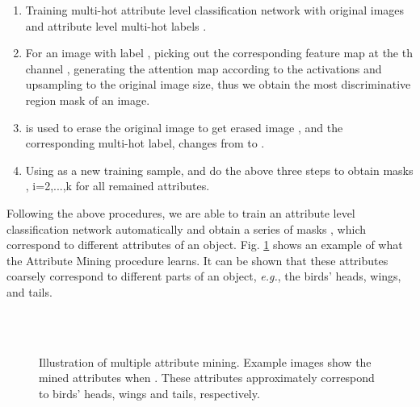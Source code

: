 \documentclass[runningheads]{llncs}
\begin{document}
\begin{enumerate}
  \vspace{-0.1cm}
  \setlength{\itemsep}{1pt}
  \setlength{\parsep}{1pt}
  \setlength{\parskip}{1pt}
 \item Training multi-hot attribute level classification network with original images and attribute level multi-hot labels .
 \item For an image with label , picking out the corresponding feature map at the th channel , generating the attention map according to the activations and upsampling to the original image size, thus we obtain the most discriminative region mask  of an image.
 \item  is used to erase the original image  to get erased image , and the corresponding multi-hot label,  changes from  to .
 \item Using  as a new training sample, and do the above three steps to obtain masks , i=2,...,k for all remained attributes.
\end{enumerate}


Following the above procedures, we are able to train an attribute level classification network automatically and obtain a series of masks , which correspond to different attributes of an object. Fig. \ref{part-heatmap} shows an example of what the Attribute Mining procedure learns. It can be shown that these attributes coarsely correspond to different parts of an object, \emph{e.g.}, the birds' heads, wings, and tails.
\begin{figure}[t]
  \centering
   \hspace{0.17cm}
   \hspace{0.17cm}
   \hspace{0.17cm}
    \\
  
   \hspace{0.17cm}
   \hspace{0.17cm}
   \hspace{0.17cm}
   \\
  \caption{Illustration of multiple attribute mining. Example images show the mined attributes when . These attributes approximately correspond to birds' heads, wings and tails, respectively.}
  \label{part-heatmap}
\end{figure}
\end{document}

